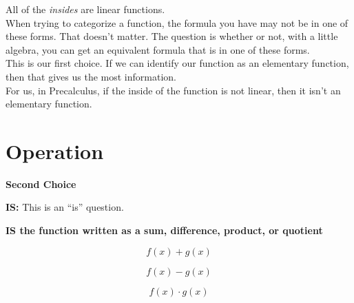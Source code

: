\documentclass{ximera}
\begin{document}
All of the \textit{insides} are linear functions. \\


When trying to categorize a function, the formula you have may not be in one of these forms.  That doesn't matter.  The question is whether or not, with a little algebra, you can get an equivalent formula that is in one of these forms. \\


This is our first choice.  If we can identify our function as an elementary function, then that gives us the most information. \\


For us, in Precalculus, if the inside of the function is not linear, then it isn't an elementary function. \\







































\section{Operation}

\textbf{\textcolor{purple!85!blue}{Second Choice}} 


\textbf{\textcolor{purple!85!blue}{IS:}}   This is an ``is'' question. \\

\begin{center}
\textbf{\textcolor{red!80!black}{IS the function written as a sum, difference, product, or quotient}}

\end{center}



\[
f(x) + g(x)
\]


\[
f(x) - g(x)
\]


\[
f(x) \cdot g(x)
\]
\end{document}
